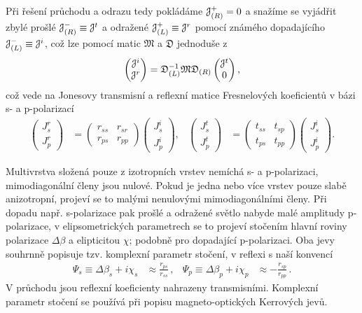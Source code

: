 Při řešení průchodu a odrazu tedy pokládáme $\mathcal{J}^+_{(R)}=0$ a snažíme se vyjádřit zbylé prošlé $\mathcal{J}^-_{(R)} \equiv \mathcal{J}^t$ a odražené $\mathcal{J}^+_{(L)} \equiv \mathcal{J}^r$ pomocí známého dopadajícího $\mathcal{J}^-_{(L)} \equiv \mathcal{J}^i$, což lze pomocí matic $\mathfrak{M}$ a $\mathfrak{D}$ jednoduše z
\begin{equation}
    \label{eqn:rovnice-odraz-pruchod}
    \begin{pmatrix} \mathcal{J}^i \\ \mathcal{J}^r \end{pmatrix}
    =\mathfrak{D}_{(L)}^{-1} \mathfrak{M} \mathfrak{D}_{(R)} 
    \begin{pmatrix} \mathcal{J}^t \\ 0 \end{pmatrix} ,
\end{equation}
což vede na Jonesovy transmisní a reflexní matice Fresnelových koeficientů v bázi s- a p-polarizací
\begin{align}
    \begin{pmatrix} J^r_s \\ J^r_p \end{pmatrix}
        &=\begin{pmatrix} r_{ss} & r_{sr} \\ r_{ps} & r_{pp} \end{pmatrix}
        \begin{pmatrix} J^i_s \\ J^i_p \end{pmatrix} 
    , & \begin{pmatrix} J^t_s \\ J^t_p \end{pmatrix}
        &=\begin{pmatrix} t_{ss} & t_{sp} \\ t_{ps} & t_{pp} \end{pmatrix}
        \begin{pmatrix} J^i_s \\ J^i_p \end{pmatrix} .
\end{align}

Multivrstva složená pouze z izotropních vrstev nemíchá s- a p-polarizaci, mimodiagonální členy jsou nulové.
Pokud je jedna nebo více vrstev pouze slabě anizotropní, projeví se to malými nenulovými mimodiagonálními členy.
Při dopadu např. s-polarizace pak prošlé a odražené světlo nabyde malé amplitudy p-polarizace, v elipsometrických parametrech se to projeví stočením hlavní roviny polarizace $\Delta \beta$ a elipticitou $\chi$; podobně pro dopadající p-polarizaci. 
Oba jevy souhrnně popisuje tzv. komplexní parametr stočení\cite{silberQuadraticMagnetoopticKerr2019a}, v reflexi s naší konvencí
\begin{align}
\label{eqn:komplexni-rotace}
\Psi_s \equiv \Delta \beta_s + i \chi_s &\approx \frac{r_{ps}}{r_{ss}} 
\,, & \Psi_p \equiv \Delta \beta_p + i \chi_p &\approx -\frac{r_{sp}}{r_{pp}} \,.
\end{align}
V průchodu jsou reflexní koeficienty nahrazeny transmisními.
Komplexní parametr stočení se používá při popisu magneto-optických Kerrových jevů.
